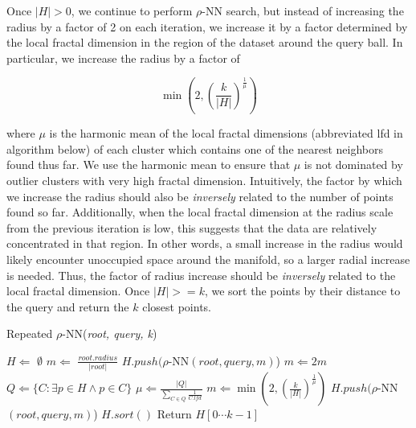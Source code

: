Once $|H| > 0$, we continue to perform $\rho$-NN search, but instead of increasing the radius by a factor of 2 on each iteration, we increase it by a factor determined by the local fractal dimension in the region of the dataset around the query ball. 
In particular, we increase the radius by a factor of

\begin{equation}
    \min \left(2, \left({\frac{k}{|H|}}\right)^{\frac{1}{\mu}}\right)
    \label{eq:repeated-rnn-factor}
\end{equation}

where $\mu$ is the harmonic mean of the local fractal dimensions (abbreviated lfd in algorithm below) of each cluster which contains one of the nearest neighbors found thus far.
We use the harmonic mean to ensure that $\mu$ is not dominated by outlier clusters with very high fractal dimension. 
Intuitively, the factor by which we increase the radius should also be \emph{inversely} related to the number of points found so far. 
Additionally, when the local fractal dimension at the radius scale from the previous iteration is low, this suggests that the data are relatively concentrated in that region.
In other words, a small increase in the radius would likely encounter unoccupied space around the manifold, so a larger radial increase is needed.
Thus, the factor of radius increase should be \emph{inversely} related to the local fractal dimension.
Once $|H| >= k$, we sort the points by their distance to the query and return the $k$ closest points.

\begin{algorithm} %
    \caption{Repeated $\rho$-NN(\emph{root, query, k})} %
    \label{alg:knn-by-rnn} %
    \begin{algorithmic} %
        \STATE $H \Leftarrow$ $\emptyset$
        \STATE $m \Leftarrow$ $\frac{root.radius}{|root|}$
            \STATE $H.push(\rho$-NN$(root, query, m)$)
            \STATE $m \Leftarrow 2m$
        \ENDWHILE
            \STATE $Q \Leftarrow \{ C: \exists p \in H \land p \in C \}$
            \STATE $\mu \Leftarrow \frac{|Q|}{\sum_{C \in Q} \frac{1}{C.lfd}} $
            \STATE $m \Leftarrow \min \left(2, \left({\frac{k}{|H|}}\right)^{\frac{1}{\mu}}\right)$
            \STATE $H.push(\rho$-NN$(root, query, m)$)
        \ENDWHILE
        \STATE $H.sort()$
        \STATE Return $H[0 \cdots k-1]$
    \end{algorithmic}
    \end{algorithm}


